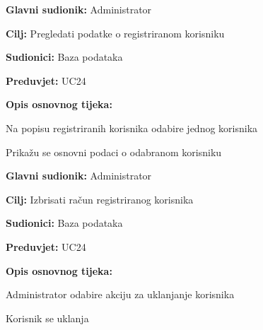 \noindent {}
\begin{packed_item}
	
	\item \textbf{Glavni sudionik:} Administrator
	\item  \textbf{Cilj:} Pregledati podatke o registriranom korisniku
	\item  \textbf{Sudionici:} Baza podataka
	\item  \textbf{Preduvjet:} UC24
	\item  \textbf{Opis osnovnog tijeka:}
	
	\item[] \begin{packed_enum}

		\item Na popisu registriranih korisnika odabire jednog korisnika
		\item Prikažu se osnovni podaci o odabranom korisniku

	\end{packed_enum}
\end{packed_item}



\noindent {}
\begin{packed_item}
	
	\item \textbf{Glavni sudionik:} Administrator
	\item  \textbf{Cilj:} Izbrisati račun registriranog korisnika
	\item  \textbf{Sudionici:} Baza podataka
	\item  \textbf{Preduvjet:} UC24
	\item  \textbf{Opis osnovnog tijeka:}
	
	\item[] \begin{packed_enum}

		\item Administrator odabire akciju za uklanjanje korisnika
		\item Korisnik se uklanja

	\end{packed_enum}
\end{packed_item}



\pagebreak

